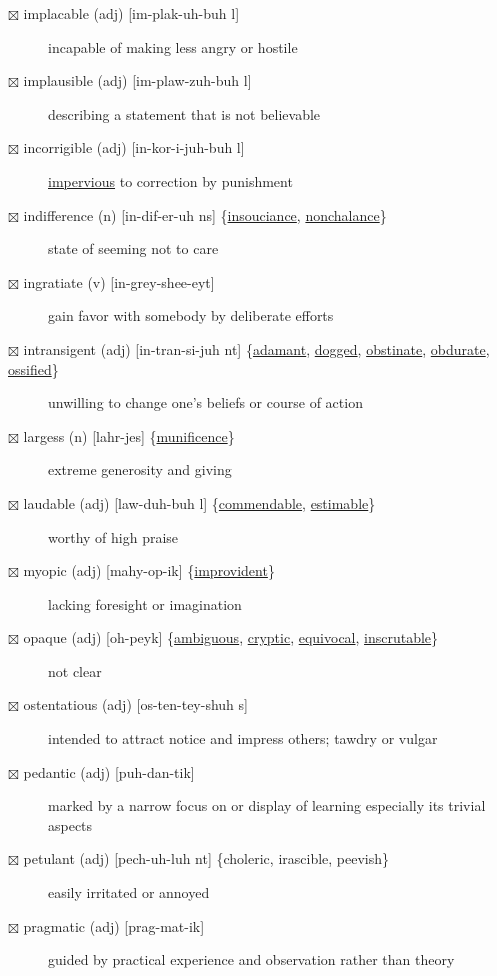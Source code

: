 \documentclass[11pt]{article}
\begin{document}
\begin{description}
\item[{$\boxtimes$ implacable (adj) [im-plak-uh-buh l]}] incapable of making less angry or hostile
\item[{$\boxtimes$ implausible (adj) [im-plaw-zuh-buh l]}] describing a statement that is not believable
\item[{$\boxtimes$ incorrigible (adj) [in-kor-i-juh-buh l]}] \hyperref[orgf7513d4]{impervious} to correction by punishment
\item[{$\boxtimes$ \label{org1f21a65} \label{org95078ca}indifference (n) [in-dif-er-uh ns] \{\hyperref[org831b3eb]{insouciance}, \hyperref[org490ece8]{nonchalance}\}}] state of seeming not to care
\item[{$\boxtimes$ ingratiate (v) [in-grey-shee-eyt]}] gain favor with somebody by deliberate efforts
\item[{$\boxtimes$ \label{org72248e8}intransigent (adj) [in-tran-si-juh nt] \{\hyperref[org45fd4bf]{adamant}, \hyperref[orgbdc7eb3]{dogged}, \hyperref[orgf57f0fc]{obstinate}, \hyperref[orgbe450f7]{obdurate}, \hyperref[org2092cc9]{ossified}\}}] unwilling to change one's beliefs or course of action
\item[{$\boxtimes$ largess (n) [lahr-jes] \{\hyperref[org036e9f8]{munificence}\}}] extreme generosity and giving
\item[{$\boxtimes$ \label{org9063730}laudable (adj) [law-duh-buh l] \{\hyperref[orge207bcb]{commendable}, \hyperref[org2d83783]{estimable}\}}] worthy of high praise
\item[{$\boxtimes$ \label{org7f20f58}myopic (adj) [mahy-op-ik] \{\hyperref[org80fefb0]{improvident}\}}] lacking foresight or imagination
\item[{$\boxtimes$ \label{org26d66c4}opaque (adj) [oh-peyk] \{\hyperref[orgc4611e5]{ambiguous}, \hyperref[org55b5c86]{cryptic}, \hyperref[orgd229018]{equivocal}, \hyperref[org3d97e2d]{inscrutable}\}}] not clear
\item[{$\boxtimes$ ostentatious (adj) [os-ten-tey-shuh s]}] intended to attract notice and impress others; tawdry or vulgar
\item[{$\boxtimes$ pedantic (adj) [puh-dan-tik]}] marked by a narrow focus on or display of learning especially its trivial aspects
\item[{$\boxtimes$ \label{org344341c}petulant (adj) [pech-uh-luh nt] \{choleric, irascible, peevish\}}] easily irritated or annoyed
\item[{$\boxtimes$ pragmatic (adj) [prag-mat-ik]}] guided by practical experience and observation rather than theory

\end{description}
\end{document}
